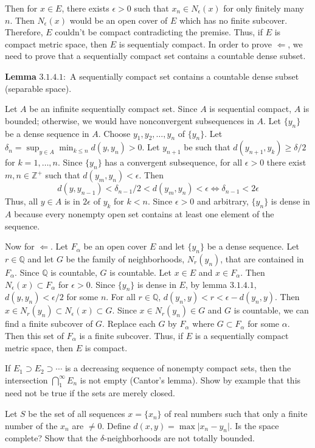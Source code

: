 \begin{exercise}
  Then for \(x\in E\), there exists \(\epsilon > 0\) such that
  \(x_n\in N_{\epsilon}(x)\) for only finitely many \(n\).
  Then \(N_{\epsilon}(x)\) would be an open cover of \(E\) which has no finite
  subcover.
  Therefore, \(E\) couldn't be compact contradicting the premise.
  Thus, if \(E\) is compact metric space, then \(E\) is sequentialy compact.
  In order to prove \(\Leftarrow\), we need to prove that a sequentially
  compact set contains a countable dense subset.
  \par\smallskip
  \textbf{Lemma} \(\mathbold{3.1.4.1:}\) A sequentially compact set contains
  a countable dense subset (separable space).
  \par\smallskip
  Let \(A\) be an infinite sequentially compact set.
  Since \(A\) is sequential compact, \(A\) is bounded; otherwise, we would have
  nonconvergent subsequences in \(A\).
  Let \(\{y_n\}\) be a dense sequence in \(A\).
  Choose \(y_1,y_2,\ldots,y_n\) of \(\{y_n\}\).
  Let \(\delta_n = \sup_{y\in A}\min_{k\leq n}d(y,y_n) > 0\).
  Let \(y_{n + 1}\) be such that \(d(y_{n + 1},y_k)\geq\delta/2\) for
  \(k = 1,\ldots,n\).
  Since \(\{y_n\}\) has a convergent subsequence, for all \(\epsilon > 0\)
  there exist \(m,n\in\mathbb{Z}^+\) such that \(d(y_m,y_n) < \epsilon\).
  Then
  \[
  d(y,y_{n - 1}) < \delta_{n - 1}/2 < d(y_m,y_n) < \epsilon\iff
  \delta_{n - 1} < 2\epsilon
  \]
  Thus, all \(y\in A\) is in \(2\epsilon\) of \(y_k\) for \(k < n\).
  Since \(\epsilon > 0\) and arbitrary, \(\{y_n\}\) is dense in \(A\) because
  every nonempty open set contains at least one element of the sequence.
  \par\smallskip
  Now for \(\Leftarrow\).
  Let \(F_{\alpha}\) be an open cover \(E\) and let \(\{y_n\}\) be a dense
  sequence.
  Let \(r\in\mathbb{Q}\) and let \(G\) be the family of neighborhoods,
  \(N_r(y_n)\), that are contained in \(F_{\alpha}\).
  Since \(\mathbb{Q}\) is countable, \(G\) is countable.
  Let \(x\in E\) and \(x\in F_{\alpha}\).
  Then \(N_{\epsilon}(x)\subset F_{\alpha}\) for \(\epsilon > 0\).
  Since \(\{y_n\}\) is dense in \(E\), by lemma \(3.1.4.1\),
  \(d(y,y_n) < \epsilon/2\) for some \(n\).
  For all \(r\in\mathbb{Q}\), \(d(y_n,y) < r < \epsilon - d(y_n,y)\).
  Then \(x\in N_r(y_n)\subset N_{\epsilon}(x)\subset G\).
  Since \(x\in N_r(y_n)\in G\) and \(G\) is countable, we can find a finite
  subcover of \(G\).
  Replace each \(G\) by \(F_{\alpha}\) where \(G\subset F_{\alpha}\) for some
  \(\alpha\).
  Then this set of \(F_{\alpha}\) is a finite subcover.
  Thus, if \(E\) is a sequentially compact metric space, then \(E\) is compact.
\item
  If \(E_1\supset E_2\supset\cdots\) is a decreasing sequence of nonempty
  compact sets, then the intersection \(\bigcap_1^{\infty}E_n\) is not empty
  (Cantor's lemma).
  Show by example that this need not be true if the sets are merely closed.
\item
  Let \(S\) be the set of all sequences \(x = \{x_n\}\) of real numbers such
  that only a finite number of the \(x_n\) are \(\neq 0\).
  Define \(d(x,y) = \max\lvert x_n - y_n\rvert\).
  Is the space complete?
  Show that the \(\delta\)-neighborhoods are not totally bounded.
\end{exercise}

